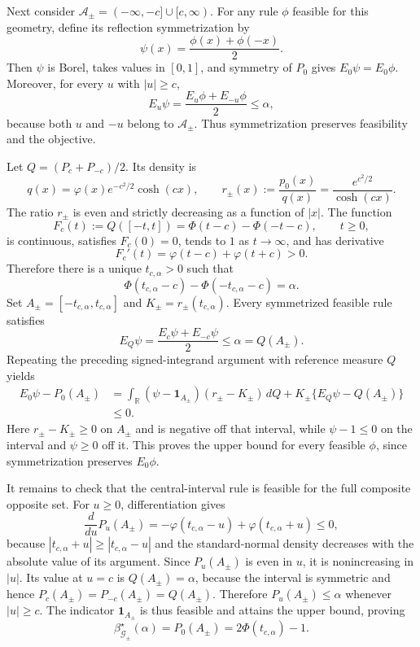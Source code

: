 Next consider \(\mathcal A_{\pm}=(-\infty,-c]\cup[c,\infty)\).  For any rule \(\phi\) feasible for this geometry, define its reflection symmetrization by
\[
 \psi(x)=\frac{\phi(x)+\phi(-x)}{2}.
\]
Then \(\psi\) is Borel, takes values in \([0,1]\), and symmetry of \(P_0\) gives \(E_0\psi=E_0\phi\).  Moreover, for every \(u\) with \(|u|\geq c\),
\[
 E_u\psi=\frac{E_u\phi+E_{-u}\phi}{2}\leq\alpha,
\]
because both \(u\) and \(-u\) belong to \(\mathcal A_{\pm}\).  Thus symmetrization preserves feasibility and the objective.

Let \(Q=(P_c+P_{-c})/2\).  Its density is
\[
 q(x)=\varphi(x)e^{-c^2/2}\cosh(cx),
 \qquad
 r_{\pm}(x):=\frac{p_0(x)}{q(x)}
 =\frac{e^{c^2/2}}{\cosh(cx)}.
\]
The ratio \(r_{\pm}\) is even and strictly decreasing as a function of \(|x|\).  The function
\[
 F_c(t):=Q([-t,t])=\Phi(t-c)-\Phi(-t-c),\qquad t\geq0,
\]
is continuous, satisfies \(F_c(0)=0\), tends to \(1\) as \(t\to\infty\), and has derivative
\[
 F_c'(t)=\varphi(t-c)+\varphi(t+c)>0.
\]
Therefore there is a unique \(t_{c,\alpha}>0\) such that
\[
 \Phi(t_{c,\alpha}-c)-\Phi(-t_{c,\alpha}-c)=\alpha.
\]
Set \(A_{\pm}=[-t_{c,\alpha},t_{c,\alpha}]\) and \(K_{\pm}=r_{\pm}(t_{c,\alpha})\).  Every symmetrized feasible rule satisfies
\[
 E_Q\psi=\frac{E_c\psi+E_{-c}\psi}{2}\leq\alpha=Q(A_{\pm}).
\]
Repeating the preceding signed-integrand argument with reference measure \(Q\) yields
\[
 \begin{aligned}
 E_0\psi-P_0(A_{\pm})
 &=\int_{\mathbb R}(\psi-\mathbf 1_{A_{\pm}})(r_{\pm}-K_{\pm})\,dQ
   +K_{\pm}\{E_Q\psi-Q(A_{\pm})\}\\
 &\leq0.
 \end{aligned}
\]
Here \(r_{\pm}-K_{\pm}\geq0\) on \(A_{\pm}\) and is negative off that interval, while \(\psi-1\leq0\) on the interval and \(\psi\geq0\) off it.  This proves the upper bound for every feasible \(\phi\), since symmetrization preserves \(E_0\phi\).

It remains to check that the central-interval rule is feasible for the full composite opposite set.  For \(u\geq0\), differentiation gives
\[
 \frac{d}{du}P_u(A_{\pm})
 =-\varphi(t_{c,\alpha}-u)+\varphi(t_{c,\alpha}+u)\leq0,
\]
because \(|t_{c,\alpha}+u|\geq|t_{c,\alpha}-u|\) and the standard-normal density decreases with the absolute value of its argument.  Since \(P_u(A_{\pm})\) is even in \(u\), it is nonincreasing in \(|u|\).  Its value at \(u=c\) is \(Q(A_{\pm})=\alpha\), because the interval is symmetric and hence \(P_c(A_{\pm})=P_{-c}(A_{\pm})=Q(A_{\pm})\).  Therefore \(P_u(A_{\pm})\leq\alpha\) whenever \(|u|\geq c\).  The indicator \(\mathbf 1_{A_{\pm}}\) is thus feasible and attains the upper bound, proving
\[
 \beta^{\star}_{\mathcal G_{\pm}}(\alpha)
 =P_0(A_{\pm})=2\Phi(t_{c,\alpha})-1.
\]

